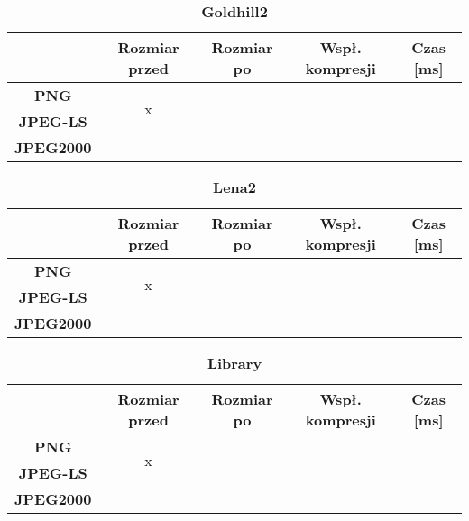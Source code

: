\begin{table}[!h]
	\centering
	\caption{\textbf{Goldhill2}}
	\label{my-label}
	\begin{tabular}{|c|c|c|c|c|}                                             
		\hline
		& \textbf{Rozmiar przed} & \textbf{Rozmiar po} & \textbf{Wspł. kompresji} & \textbf{Czas {[}ms{]}} \\ \hline 
		\textbf{PNG}      &          \multicolumn{1}{c|}{\multirow{2}{*}{x}}             &                     &                          &                             \\\cline{3-5}
		\textbf{JPEG-LS}  &                        &                     &                          &                          \\\cline{3-5}
		\textbf{JPEG2000} &                        &                     &                          &                      \\ \hline
	\end{tabular}
\end{table}

\begin{table}[!h]
	\centering
	\caption{\textbf{Lena2}}
	\label{my-label}
	\begin{tabular}{|c|c|c|c|c|}                                             
		\hline
		& \textbf{Rozmiar przed} & \textbf{Rozmiar po} & \textbf{Wspł. kompresji} & \textbf{Czas {[}ms{]}} \\ \hline 
		\textbf{PNG}      &          \multicolumn{1}{c|}{\multirow{2}{*}{x}}             &                     &                          &                             \\\cline{3-5}
		\textbf{JPEG-LS}  &                        &                     &                          &                          \\\cline{3-5}
		\textbf{JPEG2000} &                        &                     &                          &                      \\ \hline
	\end{tabular}
\end{table}

\begin{table}[!h]
	\centering
	\caption{\textbf{Library}}
	\label{my-label}
	\begin{tabular}{|c|c|c|c|c|}                                             
		\hline
		& \textbf{Rozmiar przed} & \textbf{Rozmiar po} & \textbf{Wspł. kompresji} & \textbf{Czas {[}ms{]}} \\ \hline 
		\textbf{PNG}      &          \multicolumn{1}{c|}{\multirow{2}{*}{x}}             &                     &                          &                             \\\cline{3-5}
		\textbf{JPEG-LS}  &                        &                     &                          &                          \\\cline{3-5}
		\textbf{JPEG2000} &                        &                     &                          &                      \\ \hline
	\end{tabular}
\end{table}

